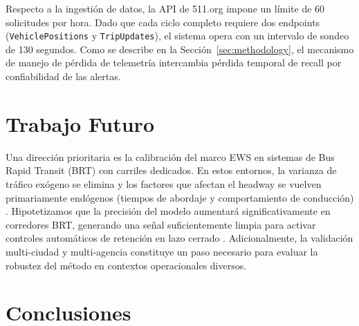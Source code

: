 \documentclass[fleqn,10pt,lineno]{wlpeerj}
\begin{document}
Respecto a la ingesti\'on de datos, la API de 511.org impone un l\'imite de 60 solicitudes por hora. Dado que cada ciclo completo requiere dos endpoints (\texttt{VehiclePositions} y \texttt{TripUpdates}), el sistema opera con un intervalo de sondeo de 130 segundos. Como se describe en la Secci\'on~\ref{sec:methodology}, el mecanismo de manejo de p\'erdida de telemetr\'ia intercambia p\'erdida temporal de recall por confiabilidad de las alertas.

\section{Trabajo Futuro}
\label{sec:futurework}

Una direcci\'on prioritaria es la calibraci\'on del marco EWS en sistemas de Bus Rapid Transit (BRT) con carriles dedicados. En estos entornos, la varianza de tr\'afico ex\'ogeno se elimina y los factores que afectan el headway se vuelven primariamente end\'ogenos (tiempos de abordaje y comportamiento de conducci\'on) \citep{10,29}. Hipotetizamos que la precisi\'on del modelo aumentar\'a significativamente en corredores BRT, generando una se\~nal suficientemente limpia para activar controles autom\'aticos de retenci\'on en lazo cerrado \citep{30}. Adicionalmente, la validaci\'on multi-ciudad y multi-agencia constituye un paso necesario para evaluar la robustez del m\'etodo en contextos operacionales diversos.

\section{Conclusiones}
\label{sec:conclusion}
\end{document}
